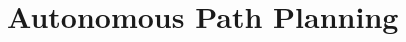 \graphicspath{{introduction/fig/}}

\chapter{Autonomous Path Planning}
\label{chap:Autonomous Path Planning}
